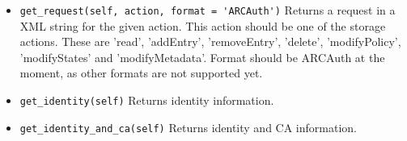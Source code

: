 \documentclass{article}
\begin{document}
\begin{flushleft}
\begin{itemize}
{  \begin{itemize}
    \item{ \verb$get_request(self, action, format = 'ARCAuth')$\newline
      Returns a request in a XML string for the given action. This action should be one of the storage actions. 
      These are 'read', 'addEntry', 'removeEntry', 'delete', 'modifyPolicy', 'modifyStates' and 'modifyMetadata'.
      Format should be ARCAuth at the moment, as other formats are not supported yet.
    }
  \end{itemize}
  \begin{itemize}
    \item{ \verb$get_identity(self)$\newline
      Returns identity information.
    }
  \end{itemize}
  \begin{itemize}
    \item{ \verb$get_identity_and_ca(self)$\newline
      Returns identity and CA information.
    }
  \end{itemize}
  }
\end{itemize}


\end{flushleft}
\end{document}
